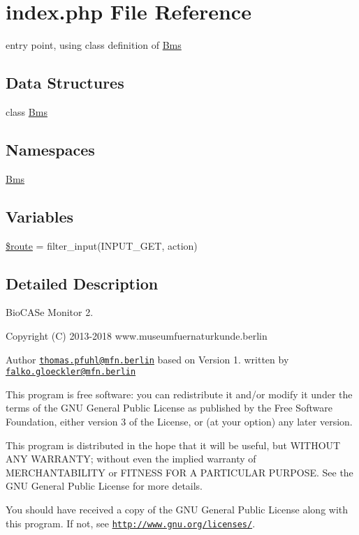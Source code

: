 \hypertarget{index_8php}{}\section{index.\+php File Reference}
\label{index_8php}


entry point, using class definition of \hyperlink{namespace_bms}{Bms}  


\subsection*{Data Structures}
\begin{DoxyCompactItemize}
\item 
class \hyperlink{class_bms_1_1_bms}{Bms}
\end{DoxyCompactItemize}
\subsection*{Namespaces}
\begin{DoxyCompactItemize}
\item 
 \hyperlink{namespace_bms}{Bms}
\end{DoxyCompactItemize}
\subsection*{Variables}
\begin{DoxyCompactItemize}
\item 
\hyperlink{namespace_bms_af4105acdee5d34dc96c2aec4058b81f9}{\$route} = filter\+\_\+input(I\+N\+P\+U\+T\+\_\+\+G\+ET, \textquotesingle{}action\textquotesingle{})
\end{DoxyCompactItemize}


\subsection{Detailed Description}
Bio\+C\+A\+Se Monitor 2.

\begin{DoxyCopyright}{Copyright}
(C) 2013-\/2018 www.\+museumfuernaturkunde.\+berlin 
\end{DoxyCopyright}
\begin{DoxyAuthor}{Author}
\href{mailto:thomas.pfuhl@mfn.berlin}{\tt thomas.\+pfuhl@mfn.\+berlin} based on Version 1. written by \href{mailto:falko.gloeckler@mfn.berlin}{\tt falko.\+gloeckler@mfn.\+berlin}
\end{DoxyAuthor}
This program is free software\+: you can redistribute it and/or modify it under the terms of the G\+NU General Public License as published by the Free Software Foundation, either version 3 of the License, or (at your option) any later version.

This program is distributed in the hope that it will be useful, but W\+I\+T\+H\+O\+UT A\+NY W\+A\+R\+R\+A\+N\+TY; without even the implied warranty of M\+E\+R\+C\+H\+A\+N\+T\+A\+B\+I\+L\+I\+TY or F\+I\+T\+N\+E\+SS F\+OR A P\+A\+R\+T\+I\+C\+U\+L\+AR P\+U\+R\+P\+O\+SE. See the G\+NU General Public License for more details.

You should have received a copy of the G\+NU General Public License along with this program. If not, see \href{http://www.gnu.org/licenses/}{\tt http\+://www.\+gnu.\+org/licenses/}. 